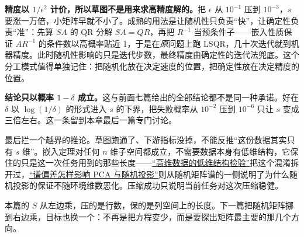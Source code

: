 \textbf{精度以 \(1/\epsilon^2\) 计价，所以草图不是用来求高精度解的。}把 \(\epsilon\) 从 \(10^{-1}\) 压到 \(10^{-3}\)，\(s\) 要涨一万倍，小矩阵早就不小了。成熟的用法是让随机性只负责``快''，让确定性负责``准''：先算 \(SA\) 的 QR 分解 \(SA=QR\)，再把 \(R^{-1}\) 当预条件子——嵌入性质保证 \(AR^{-1}\) 的条件数以高概率贴近 1，于是在\emph{原}问题上跑 LSQR，几十次迭代就到机器精度。此时随机性影响的只是迭代步数，最终精度由确定性的迭代法兜底。这个分工模式值得单独记住：把随机化放在决定速度的位置，把确定性放在决定精度的位置。

\textbf{结论只以概率 \(1-\delta\) 成立。}这与前面七篇给出的全部结论都不是同一种承诺。好在 \(\delta\) 以 \(\log(1/\delta)\) 的形式进入 \(s\) 的下界，把失败概率从 \(10^{-2}\) 压到 \(10^{-6}\) 只让 \(s\) 变成三倍左右。这一条留到本章最后一篇专门讨论。

最后拦一个越界的推论。草图跑通了、下游指标没掉，不能反推``这份数据其实只有 \(s\) 维''。嵌入定理对任何 \(n\) 维子空间都成立，不需要数据本身有低维结构，它保住的只是这一次任务用到的那些长度——\hyperref[sec:14-Deep-Learning/10-Interpretability-Mathematics/03]{``高维数据的低维结构检验''}把这个混淆拆开过，\hyperref[sec:11-Mathematical-Statistics/09-Random-Matrix-Theory/03]{``谱偏差怎样影响 PCA 与随机投影''}则从随机矩阵谱的一侧说明了为什么随机投影的保证不随环境维数恶化。压缩成功只说明当前任务对这次压缩稳健。

本篇的 \(S\) 从左边乘，压的是行数，保的是列空间上的长度。下一篇把随机矩阵挪到右边乘，目标也换一个：不再是把方程变少，而是要探出矩阵最主要的那几个方向。
